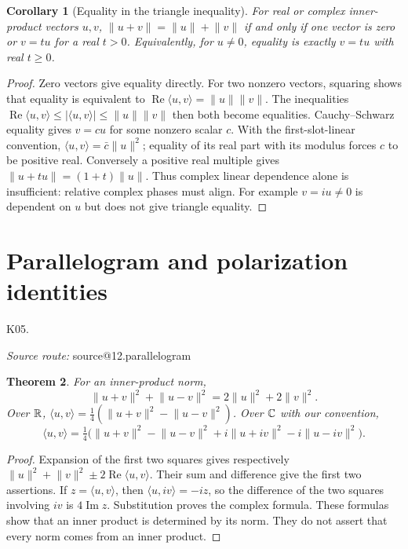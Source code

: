 \documentclass[11pt,a4paper]{book}
\makeatletter
\newtheorem{theorem}{Theorem}[chapter]
\newtheorem{corollary}[theorem]{Corollary}
\theoremstyle{definition}\newtheorem{definition}[theorem]{Definition}
\theoremstyle{remark}\newtheorem{remark}[theorem]{Remark}
\newcommand{\ip}[2]{\langle #1,#2\rangle}
\newcommand{\norm}[1]{\lVert #1\rVert}
\newcommand{\Kentry}[2]{\section{#2}\label{k:#1}\noindent\textsf{\small K05.\detokenize{#1}}\par
  \begingroup\small\color{black!65}\textit{Source route: }\csname source@#1\endcsname\par\endgroup}
\makeatother
\begin{document}
\begin{corollary}[Equality in the triangle inequality]
For real or complex inner-product vectors $u,v$,
$\norm{u+v}=\norm u+\norm v$ if and only if one vector is zero or $v=t u$ for a real $t>0$. Equivalently, for $u\ne0$, equality is exactly $v=t u$ with real $t\ge0$.
\end{corollary}
\begin{proof}
Zero vectors give equality directly. For two nonzero vectors, squaring shows that equality is equivalent to
$\operatorname{Re}\ip uv=\norm u\norm v$.
The inequalities $\operatorname{Re}\ip uv\le|\ip uv|\le\norm u\norm v$ then both become equalities. Cauchy--Schwarz equality gives $v=c u$ for some nonzero scalar $c$. With the first-slot-linear convention, $\ip uv=\bar c\norm u^2$; equality of its real part with its modulus forces $c$ to be positive real. Conversely a positive real multiple gives $\norm{u+tu}=(1+t)\norm u$. Thus complex linear dependence alone is insufficient: relative complex phases must align. For example $v=iu\ne0$ is dependent on $u$ but does not give triangle equality.
\end{proof}

\Kentry{12.parallelogram}{Parallelogram and polarization identities}
\begin{theorem}
For an inner-product norm,
\[
\norm{u+v}^2+\norm{u-v}^2=2\norm u^2+2\norm v^2.
\]
Over $\mathbb R$, $\ip{u}{v}=\tfrac14(\norm{u+v}^2-\norm{u-v}^2)$. Over $\mathbb C$ with our convention,
\[
\ip{u}{v}=\tfrac14\bigl(\norm{u+v}^2-\norm{u-v}^2
 +i\norm{u+iv}^2-i\norm{u-iv}^2\bigr).
\]
\end{theorem}
\begin{proof}
Expansion of the first two squares gives respectively
$\norm u^2+\norm v^2\pm2\operatorname{Re}\ip{u}{v}$. Their sum and difference give the first two assertions. If $z=\ip{u}{v}$, then $\ip{u}{iv}=-iz$, so the difference of the two squares involving $iv$ is $4\operatorname{Im}z$. Substitution proves the complex formula. These formulas show that an inner product is determined by its norm. They do not assert that every norm comes from an inner product.
\end{proof}
\end{document}
